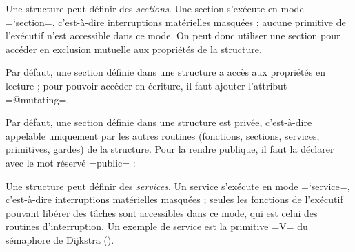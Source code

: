 

Une structure peut définir des \emph{sections}. Une section s'exécute en mode \plm=`section=, c'est-à-dire interruptions matérielles masquées ; aucune primitive de l'exécutif n'est accessible dans ce mode. On peut donc utiliser une section pour accéder en exclusion mutuelle aux propriétés de la structure.

Par défaut, une section définie dans une structure a accès aux propriétés en lecture ; pour pouvoir accéder en écriture, il faut ajouter l'attribut \plm=@mutating=.


Par défaut, une section définie dans une structure est privée, c'est-à-dire appelable uniquement par les autres routines (fonctions, sections, services, primitives, gardes) de la structure. Pour la rendre publique, il faut la déclarer avec le mot réservé \plm=public= :










Une structure peut définir des \emph{services}. Un service s'exécute en mode \plm=`service=, c'est-à-dire interruptions matérielles masquées ; seules les fonctions de l'exécutif pouvant libérer des tâches sont accessibles dans ce mode, qui est celui des routines d'interruption. Un exemple de service est la primitive \plm=V= du sémaphore de Dijkstra ().

